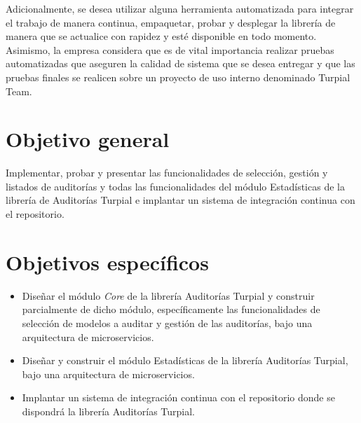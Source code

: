 Adicionalmente, se desea utilizar alguna herramienta automatizada para integrar
el trabajo de manera continua, empaquetar, probar y desplegar la librería de
manera que se actualice con rapidez y esté disponible en todo momento.
Asimismo, la empresa considera que es de vital importancia realizar pruebas
automatizadas que aseguren la calidad de sistema que se desea entregar y que
las pruebas finales se realicen sobre un proyecto de uso interno denominado
Turpial Team.

\section{Objetivo general}

Implementar, probar y presentar las funcionalidades de selección, gestión y
listados de auditorías y todas las funcionalidades del módulo Estadísticas de
la librería de Auditorías Turpial e implantar un sistema de integración
continua con el repositorio.

\section{Objetivos específicos}

\begin{itemize}
    \item Diseñar el módulo \textit{Core} de la librería Auditorías Turpial y construir parcialmente de dicho módulo, específicamente las funcionalidades de selección de modelos a auditar y gestión de las auditorías, bajo una arquitectura de microservicios.
    \item Diseñar y construir el módulo Estadísticas de la librería Auditorías Turpial, bajo una arquitectura de microservicios.
    \item Implantar un sistema de integración continua con el repositorio donde se dispondrá la librería Auditorías Turpial.
\end{itemize}
